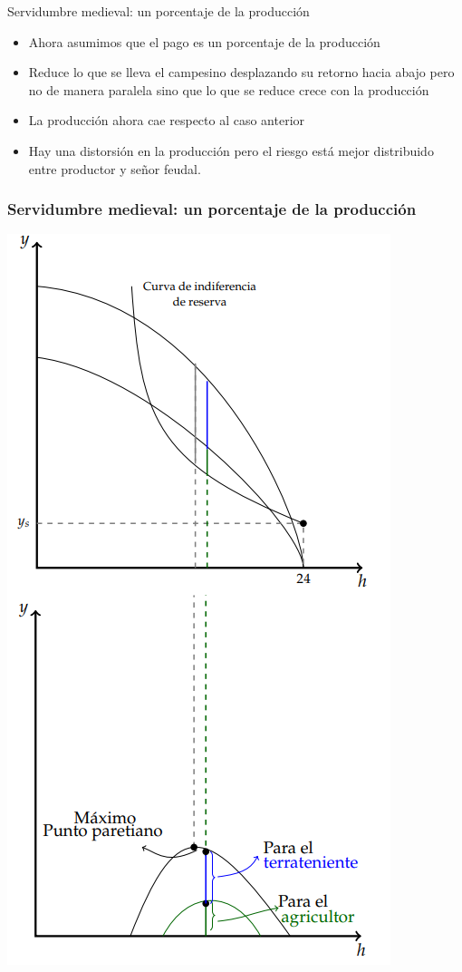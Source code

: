 \documentclass{beamer}
\begin{document}
\begin{frame}{Servidumbre medieval: un porcentaje de la producción}
    \begin{itemize}
        \item Ahora asumimos que el pago es un porcentaje de la producción 
        \item Reduce lo que se lleva el campesino desplazando su retorno hacia abajo pero no de manera paralela sino que lo que se reduce crece con la producción
        \item La producción ahora cae respecto al caso anterior
        \item Hay una distorsión en la producción pero el riesgo está mejor distribuido entre productor y señor feudal. 
    \end{itemize}
\end{frame}

\begin{frame}
\frametitle{Servidumbre medieval: un porcentaje de la producción}
\centering
\includegraphics[scale=0.45]{../Figures/C19.13.png}
\end{frame}
\end{document}
